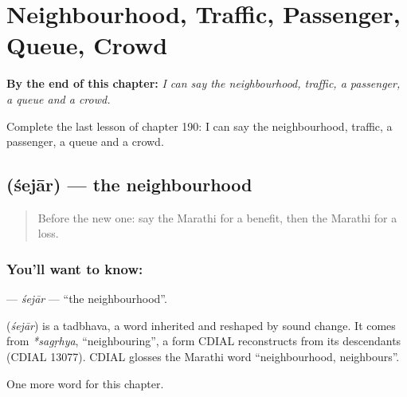 
\chapter{Neighbourhood, Traffic, Passenger, Queue, Crowd}
\label{ch:mr-neighbourhood-traffic-passenger-queue-crowd}

\begin{chapteropening}
\textbf{By the end of this chapter:} \emph{I can say the neighbourhood, traffic, a passenger, a queue and a crowd.}

Complete the last lesson of chapter 190: I can say the neighbourhood, traffic, a passenger, a queue and a crowd.
\end{chapteropening}

\section[\texorpdfstring{\mr{शेजार} (śejār)}{शेजार (śejār)}]{ (śejār) — the neighbourhood}

\label{lesson:MR-C190-sejar}



\begin{quote}
Before the new one: say the Marathi for a benefit, then the Marathi for a loss.
\end{quote}

\subsection*{You'll want to know: }
\textbf{} — \emph{śejār} — \textquotedblleft{}the neighbourhood\textquotedblright{}.

\begin{cousinweb}
\textbf{} (\emph{śejār}) is a tadbhava, a word inherited and reshaped by sound change. It comes from \emph{*sagṛhya}, \textquotedblleft{}neighbouring\textquotedblright{}, a form CDIAL reconstructs from its descendants (CDIAL 13077). CDIAL glosses the Marathi word \textquotedblleft{}neighbourhood, neighbours\textquotedblright{}.
\end{cousinweb}

\begin{grammarlens}[title={What you've built}]
One more word for this chapter.
\end{grammarlens}

